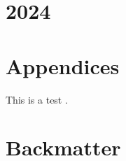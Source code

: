 %

\tableofcontents
\listoffigures
\listoftables
\renewcommand\listoflistingscaption{List of source codes}
\listoflistings
\mainmatter%

\part{2024}
\setcounter{chapter}{0}













\part{Appendices}
This is a test \cite{Mooers2016DirectMethodsStructureDeterminationOfATrypanosomeRNAEditingSubstrateFragmentWithTranslationalPseudosymmetry}.
\appendix
%
%
% 
% 
%
% 
% 
% 
% 
% 
% 
% 
% 
%  
% 
% 
% 
% 
% 
% 
\part{Backmatter}
\backmatter %

\printindex

